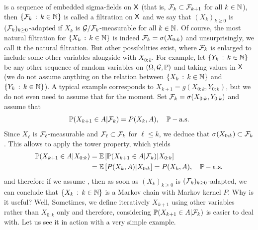 \documentclass[english,graybox,envcountchap,envcountsame,sectrefs,shortlabels]{svmono}
\theoremstyle{style}
\begin{document}
is a sequence of embedded sigma-fields on $\mathsf{X}$ (that is, $\mathcal{F}_{k}\subset\mathcal{F}_{k+1}$
for all $k\in\mathbb{N}$), then $\left\{ \mathcal{F}_{k}\,:\,k\in\mathbb{N}\right\}$ is called a filtration 
on $\mathsf{X}$ and we say that $(X_{k})_{k\geq0}$ is $(\mathcal{F}_{k})_{k\geq0}$-adapted
if $X_{k}$ is $\mathcal{G}/\mathcal{F}_{k}$-measurable for all $k\in\mathbb{N}$. Of
course, the most natural filtration for $\left\{ X_{k}\,:\,k\in\mathbb{N}\right\}$
is indeed $\mathcal{F}_{k}=\sigma(X_{0:k})$ and unsurprisingly, we call
it the natural filtration. But other possibilities exist,
where $\mathcal{F}_{k}$ is enlarged to include some other variables alongside
with $X_{0:k}$. For example, let $\left\{ Y_{k}\,:\,k\in\mathbb{N}\right\}$ be any
other sequence of random variables on $(\Omega,\mathcal{G},\mathbb{P})$ and taking
values in $\mathsf{X}$ (we do not assume anything on the relation between  $\left\{ X_{k}\,:\,k\in\mathbb{N}\right\}$ and $\left\{ Y_{k}\,:\,k\in\mathbb{N}\right\}$). A typical example corresponds
to $X_{k+1}=g(X_{0:k},Y_{0:k})$, but we do not even need to assume
that for the moment. Set $\mathcal{F}_{k}=\sigma(X_{0:k},Y_{0:k})$ and assume
that
\begin{equation}
\mathbb{P}(X_{k+1}\in A|\mathcal{F}_{k})=P(X_{k},A),\quad\mathbb{P}-\mbox{a.s.}\label{eq:def:MC:F-k}
\end{equation}
Since $X_{\ell}$ is $\mathcal{F}_{\ell}$-measurable and $\mathcal{F}_{\ell}\subset\mathcal{F}_{k}$
for $\ell\leq k$, we deduce that $\sigma(X_{0:k})\subset\mathcal{F}_{k}$.
This allows to apply the tower property, which yields
\begin{align*}
\mathbb{P}(X_{k+1}\in A|X_{0:k}) & =\mathbb{E}\left[\mathbb{P}(X_{k+1}\in A|\mathcal{F}_{k})|X_{0:k}\right]\\
 & =\mathbb{E}\left[P(X_{k},A)|X_{0:k}\right]=P(X_{k},A),\quad\mathbb{P}-\mbox{a.s.}
\end{align*}
and therefore if we assume , then as soon as $(X_{k})_{k\geq0}$
is $(\mathcal{F}_{k})_{k\geq0}$-adapted, we can conclude that $\left\{ X_{k}\,:\,k\in\mathbb{N}\right\}$
is a Markov chain with Markov kernel $P$. Why is it useful? Well,
Sometimes, we define iteratively $X_{k+1}$ using other variables
rather than $X_{0:k}$ only and therefore, considering $\mathbb{P}(X_{k+1}\in A|\mathcal{F}_{k})$
is easier to deal with. Let us see it in action with a very simple
example.
\end{document}
